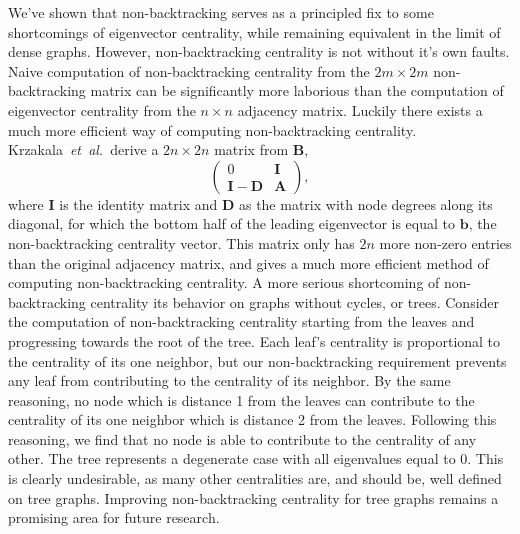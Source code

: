 \documentclass[twocolumn,prl,superscriptaddress]{revtex4}
\newcommand{\etal}{{\it{}et~al.}}
\newcommand{\mat}{\mathbf}
\renewcommand{\vec}{\mathbf}
\begin{document}
We've shown that non-backtracking serves as a principled fix to some shortcomings of eigenvector centrality, while remaining equivalent in the limit of dense graphs. However, non-backtracking centrality is not without it's own faults. 
Naive computation of non-backtracking centrality from the $2m \times 2m$ non-backtracking matrix can be significantly more laborious than the computation of eigenvector centrality from the $n \times n$ adjacency matrix. Luckily there exists a much more efficient way of computing non-backtracking centrality. Krzakala~\etal\ derive a $2n \times 2n$ matrix from $\mat{B}$,
\begin{equation}
\left(
 \begin{array}{c|c}
 0 & \mat{I} \\
  \hline
  \mat{I} - \mat{D} & \mat{A}
 \end{array} \right),
\end{equation}
where $\mat{I}$ is the identity matrix and $\mat{D}$ as the matrix with node degrees along its diagonal, for which the bottom half of the leading eigenvector is equal to $\vec{b}$, the non-backtracking centrality vector. This matrix only has $2n$ more non-zero entries than the original adjacency matrix, and gives a much more efficient method of computing non-backtracking centrality.
A more serious shortcoming of non-backtracking centrality its behavior on graphs without cycles, or trees. Consider the computation of non-backtracking centrality starting from the leaves and progressing towards the root of the tree. Each leaf's centrality is proportional to the centrality of its one neighbor, but our non-backtracking requirement prevents any leaf from contributing to the centrality of its neighbor. By the same reasoning, no node which is distance 1 from the leaves can contribute to the centrality of its one neighbor which is distance 2 from the leaves. Following this reasoning, we find that no node is able to contribute to the centrality of any other. The tree represents a degenerate case with all eigenvalues equal to 0. This is clearly undesirable, as many other centralities are, and should be, well defined on tree graphs. Improving non-backtracking centrality for tree graphs remains a promising area for future research.

\end{document}
